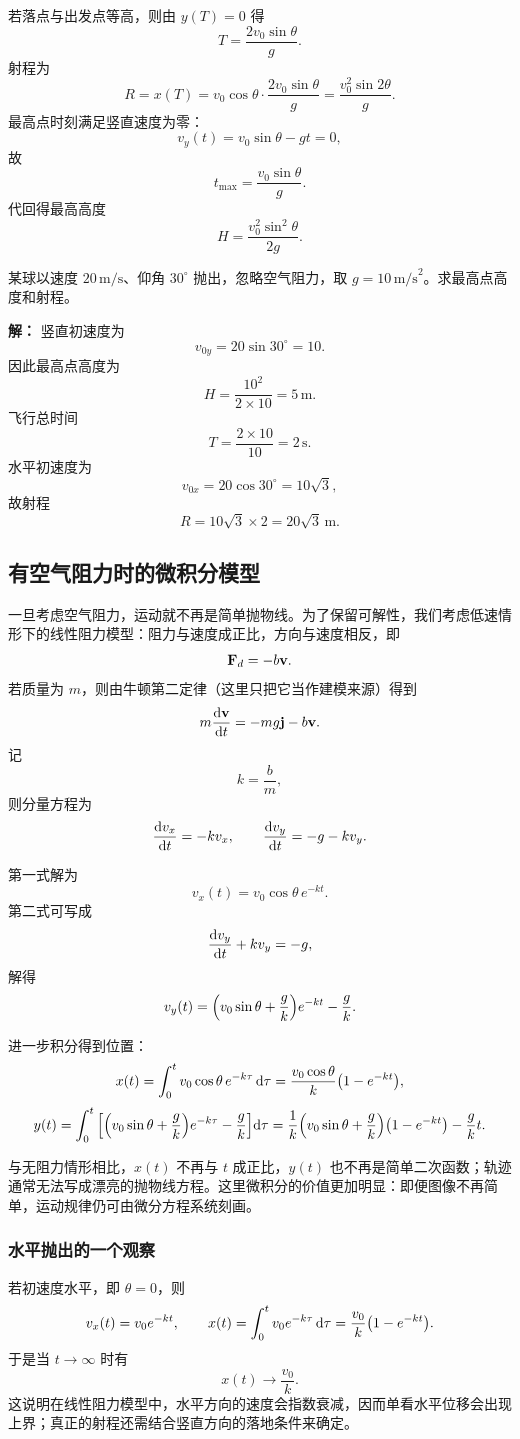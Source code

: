 若落点与出发点等高，则由 $y(T)=0$ 得
\[
 T=\frac{2v_0\sin\theta}{g}.
\]
射程为
\[
 R=x(T)=v_0\cos\theta\cdot \frac{2v_0\sin\theta}{g}
=\frac{v_0^2\sin 2\theta}{g}.
\]
最高点时刻满足竖直速度为零：
\[
 v_y(t)=v_0\sin\theta-gt=0,
\]
故
\[
 t_{\max}=\frac{v_0\sin\theta}{g}.
\]
代回得最高高度
\[
 H=\frac{v_0^2\sin^2\theta}{2g}.
\]

\begin{example}[斜抛的最高点]
某球以速度 $20\,\text{m/s}$、仰角 $30^\circ$ 抛出，忽略空气阻力，取 $g=10\,\text{m/s}^2$。求最高点高度和射程。

\textbf{解：}
竖直初速度为
\[
 v_{0y}=20\sin 30^\circ=10.
\]
因此最高点高度为
\[
 H=\frac{10^2}{2\times 10}=5\,\text{m}.
\]
飞行总时间
\[
 T=\frac{2\times 10}{10}=2\,\text{s}.
\]
水平初速度为
\[
 v_{0x}=20\cos 30^\circ=10\sqrt{3},
\]
故射程
\[
 R=10\sqrt{3}\times 2=20\sqrt{3}\,\text{m}.
\]
\end{example}

\subsection{有空气阻力时的微积分模型}

一旦考虑空气阻力，运动就不再是简单抛物线。为了保留可解性，我们考虑低速情形下的线性阻力模型：阻力与速度成正比，方向与速度相反，即
\[
\vb{F}_d=-b\vb{v}.
\]
若质量为 $m$，则由牛顿第二定律（这里只把它当作建模来源）得到
\[
 m\dv{\vb{v}}{t}=-mg\vb{j}-b\vb{v}.
\]
记
\[
 k=\frac{b}{m},
\]
则分量方程为
\[
\dv{v_x}{t}=-kv_x,
\qquad
\dv{v_y}{t}=-g-kv_y.
\]

第一式解为
\[
 v_x(t)=v_0\cos\theta\, e^{-kt}.
\]
第二式可写成
\[
\dv{v_y}{t}+kv_y=-g,
\]
解得
\[
 v_y(t)=\qty(v_0\sin\theta+\frac{g}{k})e^{-kt}-\frac{g}{k}.
\]

进一步积分得到位置：
\[
 x(t)=\int_0^t v_0\cos\theta\, e^{-k\tau}\,\dd \tau
=\frac{v_0\cos\theta}{k}\qty(1-e^{-kt}),
\]
\[
 y(t)=\int_0^t \qty[\qty(v_0\sin\theta+\frac{g}{k})e^{-k\tau}-\frac{g}{k}]\dd \tau
=\frac{1}{k}\qty(v_0\sin\theta+\frac{g}{k})\qty(1-e^{-kt})-\frac{g}{k}t.
\]

\begin{remark}
与无阻力情形相比，$x(t)$ 不再与 $t$ 成正比，$y(t)$ 也不再是简单二次函数；轨迹通常无法写成漂亮的抛物线方程。这里微积分的价值更加明显：即便图像不再简单，运动规律仍可由微分方程系统刻画。
\end{remark}

\subsubsection*{水平抛出的一个观察}
若初速度水平，即 $\theta=0$，则
\[
 v_x(t)=v_0 e^{-kt},
\qquad
 x(t)=\int_0^t v_0 e^{-k\tau}\,\dd \tau=\frac{v_0}{k}\qty(1-e^{-kt}).
\]
于是当 $t\to\infty$ 时有
\[
 x(t)\to\frac{v_0}{k}.
\]
这说明在线性阻力模型中，水平方向的速度会指数衰减，因而单看水平位移会出现上界；真正的射程还需结合竖直方向的落地条件来确定。

